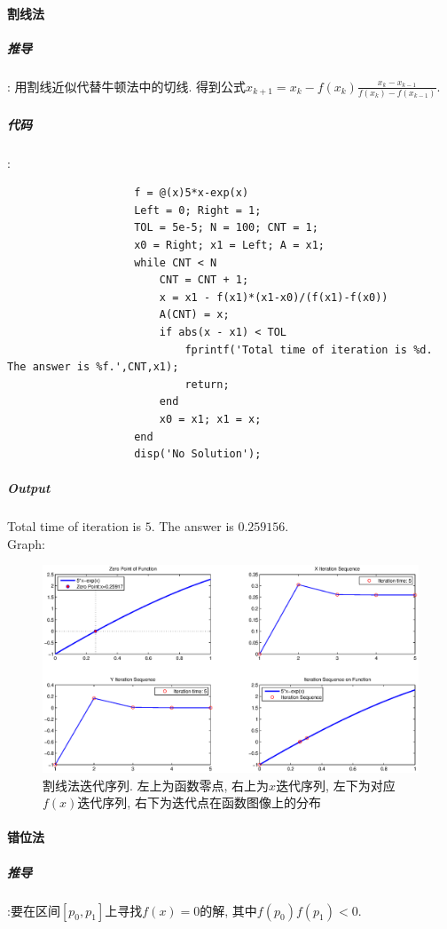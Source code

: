 \documentclass{article}
\begin{document}
\begin{CJK*}{UTF8}{song}
			\paragraph{割线法}
				\subparagraph{推导}
				: \newline
				用割线近似代替牛顿法中的切线.
				得到公式$x_{k+1} = x_k - f\left(x_k\right) \frac{x_k - x_{k-1}}{f\left(x_k\right) - f\left( x_{k-1}\right)}$.
				
				\subparagraph{代码}
				:\newline
					\begin{lstlisting}
					f = @(x)5*x-exp(x)
					Left = 0; Right = 1;
					TOL = 5e-5; N = 100; CNT = 1;
					x0 = Right; x1 = Left; A = x1;
					while CNT < N
						CNT = CNT + 1;
						x = x1 - f(x1)*(x1-x0)/(f(x1)-f(x0))
						A(CNT) = x;
						if abs(x - x1) < TOL
							fprintf('Total time of iteration is %d. The answer is %f.',CNT,x1);
							return;
						end
						x0 = x1; x1 = x;
					end
					disp('No Solution');
					\end{lstlisting}
				\subparagraph{Output}
				Total time of iteration is $5$. The answer is $0.259156$.\\
				Graph:\\
				\begin{figure}[H]
					\centering
					\includegraphics[width=1.0\textwidth]{../chapter2_4_3.eps}
					\caption{割线法迭代序列. 左上为函数零点, 右上为$x$迭代序列, 左下为对应$f\left(x\right)$迭代序列, 右下为迭代点在函数图像上的分布}
					\label{img_chapter2_4_3}
				\end{figure}
			\paragraph{错位法}
				\subparagraph{推导}
					:要在区间$\left[p_0,p_1 \right]$上寻找$f\left(x\right) = 0$的解, 其中$f\left(p_0 \right) f\left(p_1 \right) < 0$.
					

\end{CJK*}
\end{document}
